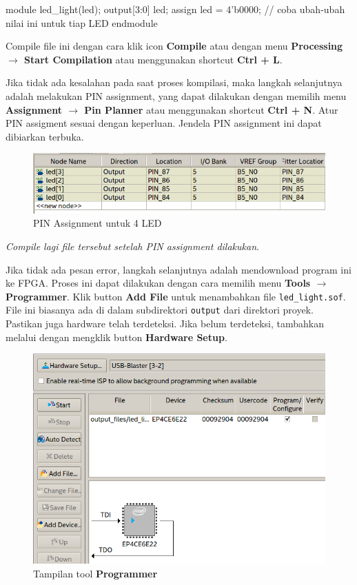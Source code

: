 \documentclass[a4paper,12pt,bahasa]{extarticle}
\begin{document}
{
\begin{verilogcode}
module led_light(led);
  output[3:0] led;
  assign led = 4'b0000; // coba ubah-ubah nilai ini untuk tiap LED
endmodule
\end{verilogcode}
}

Compile file ini dengan cara klik icon \textbf{Compile} atau dengan menu
\textbf{Processing $\rightarrow$ Start Compilation} atau menggunakan shortcut
\textbf{Ctrl + L}.

Jika tidak ada kesalahan pada saat proses kompilasi,
maka langkah selanjutnya adalah melakukan
PIN assignment, yang dapat dilakukan dengan memilih menu
\textbf{Assignment $\rightarrow$ Pin Planner} atau menggunakan shortcut
\textbf{Ctrl + N}. Atur PIN assigment sesuai dengan keperluan.
Jendela PIN assignment ini dapat dibiarkan terbuka.

\begin{figure}[H]
\centering
\includegraphics[scale=0.5]{images/PinPlanner_4LED.png}
\par
\caption{PIN Assignment untuk 4 LED}
\end{figure}

\textit{Compile lagi file tersebut setelah PIN assignment dilakukan}.

Jika tidak ada pesan error, langkah selanjutnya adalah mendownload program
ini ke FPGA. Proses ini dapat dilakukan dengan cara memilih menu
\textbf{Tools $\rightarrow$ Programmer}.
Klik button \textbf{Add File} untuk menambahkan file {\tt led\_light.sof}.
File ini biasanya ada di dalam subdirektori {\tt output} dari direktori
proyek.
Pastikan juga hardware telah terdeteksi. Jika belum terdeteksi, tambahkan melalui
dengan mengklik button \textbf{Hardware Setup}.

\begin{figure}[H]
\centering
\includegraphics[scale=0.6]{images/Programmer_4LED.png}
\par
\caption{Tampilan tool \textbf{Programmer}}
\end{figure}
\end{document}
